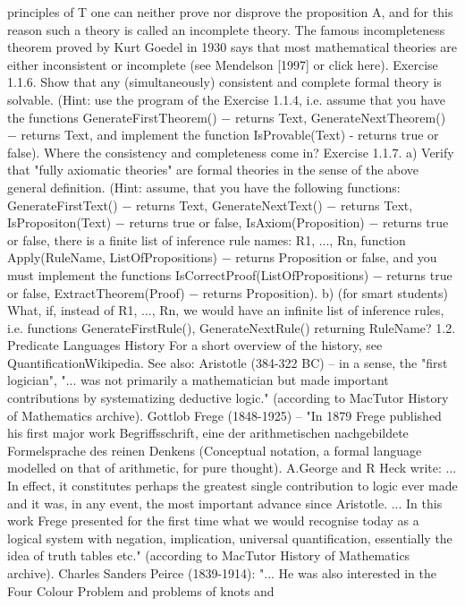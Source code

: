 principles of T one can neither prove nor disprove the proposition A, and for this reason such a theory is
called an incomplete theory. The famous incompleteness theorem proved by Kurt Goedel in 1930 says
that most mathematical theories are either inconsistent or incomplete (see Mendelson [1997] or click
here).
Exercise 1.1.6. Show that any (simultaneously) consistent and complete formal theory is solvable. (Hint:
use the program of the Exercise 1.1.4, i.e. assume that you have the functions GenerateFirstTheorem() −
returns Text, GenerateNextTheorem() − returns Text, and implement the function IsProvable(Text) -
returns true or false). Where the consistency and completeness come in?
Exercise 1.1.7. a) Verify that "fully axiomatic theories" are formal theories in the sense of the above
general definition. (Hint: assume, that you have the following functions: GenerateFirstText() − returns
Text, GenerateNextText() − returns Text, IsPropositon(Text) − returns true or false, IsAxiom(Proposition) −
returns true or false, there is a finite list of inference rule names: {R1, ..., Rn}, function Apply(RuleName,
ListOfPropositions) − returns Proposition or false, and you must implement the functions
IsCorrectProof(ListOfPropositions) − returns true or false, ExtractTheorem(Proof) − returns Proposition).
b) (for smart students) What, if, instead of {R1, ..., Rn}, we would have an infinite list of inference rules,
i.e. functions GenerateFirstRule(), GenerateNextRule() returning RuleName?
1.2. Predicate Languages
History
For a short overview of the history, see QuantificationWikipedia.
See also:
Aristotle (384-322 BC) – in a sense, the "first logician", "... was not primarily a mathematician but made important
contributions by systematizing deductive logic." (according to MacTutor History of Mathematics archive).
Gottlob Frege (1848-1925) – "In 1879 Frege published his first major work Begriffsschrift, eine der arithmetischen
nachgebildete Formelsprache des reinen Denkens (Conceptual notation, a formal language modelled on that of arithmetic, for
pure thought). A.George and R Heck write: ... In effect, it constitutes perhaps the greatest single contribution to logic ever
made and it was, in any event, the most important advance since Aristotle. ... In this work Frege presented for the first time
what we would recognise today as a logical system with negation, implication, universal quantification, essentially the idea of
truth tables etc." (according to MacTutor History of Mathematics archive).
Charles Sanders Peirce (1839-1914): "... He was also interested in the Four Colour Problem and problems of knots and
